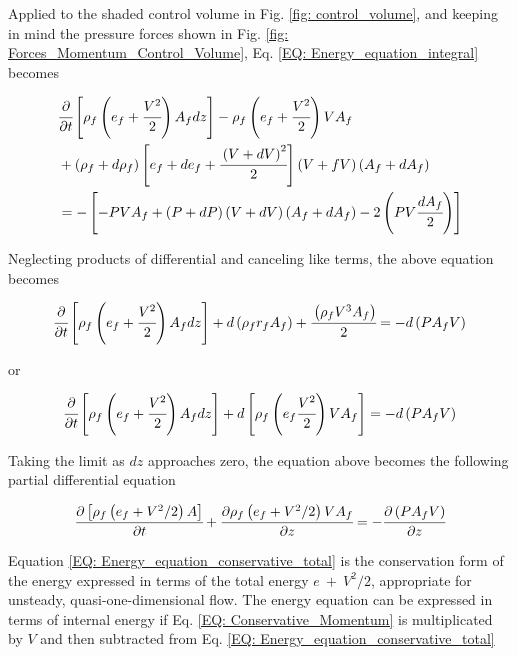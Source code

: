 \documentclass[../Article_Model_Parameters.tex]{subfiles}
\begin{document}
	Applied to the shaded control volume in Fig. \ref{fig: control_volume}, and keeping in mind the pressure forces shown in Fig. \ref{fig: Forces_Momentum_Control_Volume}, Eq. \ref{EQ: Energy_equation_integral} becomes
	
	{\footnotesize
		\begin{align}
			&\cfrac{\partial}{\partial t} \left[ \rho_f \left( e_f + \cfrac{V^2}{2} \right) A_f dz \right] - \rho_f \left( e_f + \cfrac{V^2}{2} \right) V A_f \nonumber \\
			&+ \left( \rho_f + d\rho_f \right) \left[ e_f + de_f + \cfrac{\left( V + dV \right)^2}{2} \right] \left( V+fV \right) \left( A_f+dA_f \right) \nonumber \\
			&= - \left[ -PVA_f + \left(P+dP\right) \left(V+dV\right) \left(A_f+dA_f\right) - 2\left( PV\cfrac{dA_f}{2} \right) \right]
		\end{align}
	}
	
	Neglecting products of differential and canceling like terms, the above equation becomes
	
	{\footnotesize
		\begin{equation}
			\cfrac{\partial}{\partial t} \left[ \rho_f \left( e_f + \cfrac{V^2}{2} \right) A_f dz \right] + d\left( \rho_f r_f A_f \right) + \cfrac{ \left( \rho_f V^3 A_f \right) }{2} = -d \left( P A_f V \right)
		\end{equation}
	}

	or
	
	{\footnotesize
		\begin{equation}
			\cfrac{\partial}{\partial t} \left[ \rho_f \left( e_f + \cfrac{V^2}{2} \right) A_f dz \right] + d \left[ \rho_f \left( e_f \cfrac{V^2}{2} \right) VA_f \right] = - d\left( P A_f V \right)
		\end{equation}
	}

	Taking the limit as $dz$ approaches zero, the equation above becomes the following partial differential equation
	
	{\footnotesize
		\begin{equation}
			\cfrac{\partial \left[ \rho_f \left( e_f + V^2 / 2 \right) A \right]}{\partial t} + \cfrac{\partial \rho_f \left( e_f + V^2 / 2 \right)VA_f}{\partial z} = -\cfrac{\partial \left( P A_f V \right)}{\partial z}
			\label{EQ: Energy_equation_conservative_total}
		\end{equation}
	}
	
	Equation \ref{EQ: Energy_equation_conservative_total} is the conservation form of the energy expressed in terms of the total energy $e~+~V^2/2$, appropriate for unsteady, quasi-one-dimensional flow. The energy equation can be expressed in terms of internal energy if Eq. \ref{EQ: Conservative_Momentum} is multiplicated by $V$ and then subtracted from Eq. \ref{EQ: Energy_equation_conservative_total}
	
\end{document}
